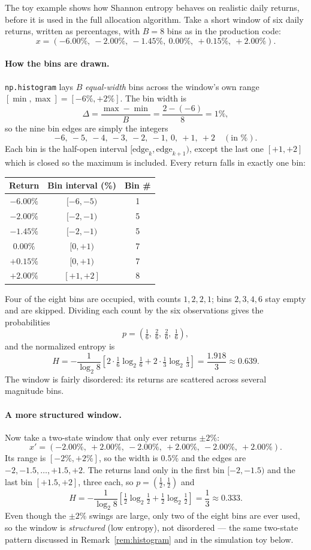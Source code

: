 \documentclass[a4paper,12pt]{article}
\begin{document}
The toy example shows how Shannon entropy behaves on realistic daily returns, before it is used in the full allocation algorithm. Take a short window of six daily returns, written as percentages, with $B=8$ bins as in the production code:
\[
x=(-6.00\%,\ -2.00\%,\ -1.45\%,\ 0.00\%,\ +0.15\%,\ +2.00\%).
\]

\paragraph{How the bins are drawn.} \texttt{np.histogram} lays $B$ \emph{equal-width} bins across the window's own range $[\min,\max]=[-6\%,+2\%]$. The bin width is
\[
\Delta=\frac{\max-\min}{B}=\frac{2-(-6)}{8}=1\%,
\]
so the nine bin edges are simply the integers
\[
-6,\ -5,\ -4,\ -3,\ -2,\ -1,\ 0,\ +1,\ +2\quad(\text{in }\%).
\]
Each bin is the half-open interval $[\text{edge}_k,\text{edge}_{k+1})$, except the last one $[+1,+2]$ which is closed so the maximum is included. Every return falls in exactly one bin:
\begin{center}
\begin{tabular}{ccc}
\toprule
Return & Bin interval (\%) & Bin \# \\
\midrule
$-6.00\%$ & $[-6,-5)$ & 1 \\
$-2.00\%$ & $[-2,-1)$ & 5 \\
$-1.45\%$ & $[-2,-1)$ & 5 \\
$0.00\%$  & $[0,+1)$  & 7 \\
$+0.15\%$ & $[0,+1)$  & 7 \\
$+2.00\%$ & $[+1,+2]$ & 8 \\
\bottomrule
\end{tabular}
\end{center}
Four of the eight bins are occupied, with counts $1,2,2,1$; bins $2,3,4,6$ stay empty and are skipped. Dividing each count by the six observations gives the probabilities
\[
p=\left(\tfrac{1}{6},\ \tfrac{2}{6},\ \tfrac{2}{6},\ \tfrac{1}{6}\right),
\]
and the normalized entropy is
\[
H=-\frac{1}{\log_2 8}\left[2\cdot\tfrac{1}{6}\log_2\tfrac{1}{6}+2\cdot\tfrac{1}{3}\log_2\tfrac{1}{3}\right]
=\frac{1.918}{3}\approx 0.639.
\]
The window is fairly disordered: its returns are scattered across several magnitude bins.

\paragraph{A more structured window.} Now take a two-state window that only ever returns $\pm 2\%$:
\[
x'=(-2.00\%,\ +2.00\%,\ -2.00\%,\ +2.00\%,\ -2.00\%,\ +2.00\%).
\]
Its range is $[-2\%,+2\%]$, so the width is $0.5\%$ and the edges are $-2,-1.5,\ldots,+1.5,+2$. The returns land only in the first bin $[-2,-1.5)$ and the last bin $[+1.5,+2]$, three each, so $p=(\tfrac12,\tfrac12)$ and
\[
H=-\frac{1}{\log_2 8}\left[\tfrac12\log_2\tfrac12+\tfrac12\log_2\tfrac12\right]
=\frac{1}{3}\approx 0.333.
\]
Even though the $\pm 2\%$ swings are large, only two of the eight bins are ever used, so the window is \emph{structured} (low entropy), not disordered --- the same two-state pattern discussed in Remark~\ref{rem:histogram} and in the simulation toy below.
\end{document}
